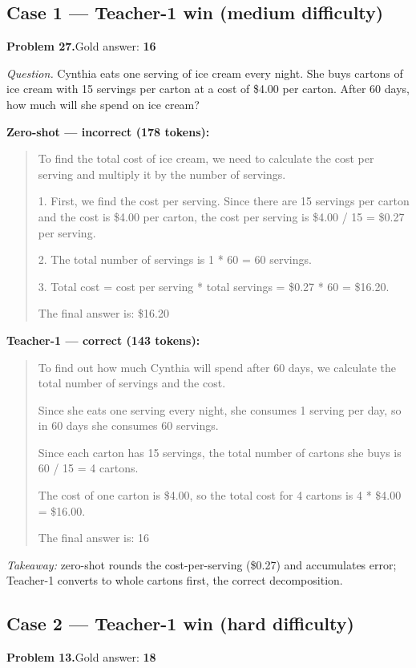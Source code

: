 \documentclass[11pt]{article}
\begin{document}
\subsection*{Case 1 --- Teacher-1 win (medium difficulty)}
\noindent\textbf{Problem 27.}\quad Gold answer: \textbf{16}

\textit{Question.} Cynthia eats one serving of ice cream every night. She buys
cartons of ice cream with 15 servings per carton at a cost of \$4.00 per carton.
After 60 days, how much will she spend on ice cream?

\noindent\textbf{Zero-shot --- incorrect (178 tokens):}
\begin{quote}\small
To find the total cost of ice cream, we need to calculate the cost per serving and multiply it by the number of servings.

1. First, we find the cost per serving. Since there are 15 servings per carton and the cost is \$4.00 per carton, the cost per serving is \$4.00 / 15 = \$0.27 per serving.

2. The total number of servings is 1 * 60 = 60 servings.

3. Total cost = cost per serving * total servings = \$0.27 * 60 = \$16.20.

The final answer is: \$16.20
\end{quote}

\noindent\textbf{Teacher-1 --- correct (143 tokens):}
\begin{quote}\small
To find out how much Cynthia will spend after 60 days, we calculate the total number of servings and the cost.

Since she eats one serving every night, she consumes 1 serving per day, so in 60 days she consumes 60 servings.

Since each carton has 15 servings, the total number of cartons she buys is 60 / 15 = 4 cartons.

The cost of one carton is \$4.00, so the total cost for 4 cartons is 4 * \$4.00 = \$16.00.

The final answer is: 16
\end{quote}
\emph{Takeaway:} zero-shot rounds the cost-per-serving (\$0.27) and accumulates
error; Teacher-1 converts to whole cartons first, the correct decomposition.

\subsection*{Case 2 --- Teacher-1 win (hard difficulty)}
\noindent\textbf{Problem 13.}\quad Gold answer: \textbf{18}
\end{document}
